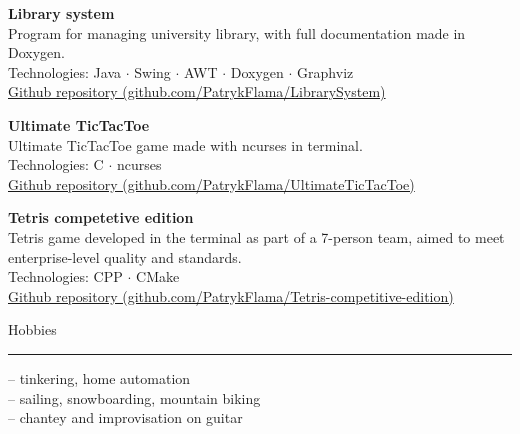 \documentclass{letter}
\begin{document}
\begin{minipage}[t]{0.70\textwidth}
\begin{tcolorbox}[colback=white, colframe=white, width=\textwidth, boxrule=0pt, sharp corners, height=\textheight, left=5mm, right=5mm, top=5mm, bottom=5mm]
{\textbf{Library system}  \\
Program for managing university library, with full documentation made in Doxygen. \\
{\small Technologies: Java $\cdot$ Swing $\cdot$ AWT $\cdot$ Doxygen $\cdot$ Graphviz } \\
{\small \href{https://github.com/PatrykFlama/LibrarySystem}{Github repository (github.com/PatrykFlama/LibrarySystem)}}

\textbf{Ultimate TicTacToe}  \\
Ultimate TicTacToe game made with ncurses in terminal. \\
{\small Technologies:  C $\cdot$ ncurses } \\
{\small \href{https://github.com/PatrykFlama/UltimateTicTacToe}{Github repository (github.com/PatrykFlama/UltimateTicTacToe)}} 

\textbf{Tetris competetive edition}  \\
Tetris game developed in the terminal as part of a 7-person team, aimed to meet enterprise-level quality and standards. \\
{\small Technologies:  CPP $\cdot$ CMake } \\
{\small \href{https://github.com/PatrykFlama/Tetris-competitive-edition}{Github repository (github.com/PatrykFlama/Tetris-competitive-edition)}} 

}


\vspace{\SectionSpacing}

{\large Hobbies}
\rule{\linewidth}{0.4pt}

{ 
-- tinkering, home automation\\
-- sailing, snowboarding, mountain biking\\
-- chantey and improvisation on guitar

}


\vfill

\vspace{-0.2cm}

\let\thefootnote\relax{}


\end{tcolorbox}
\end{minipage}
\end{document}
